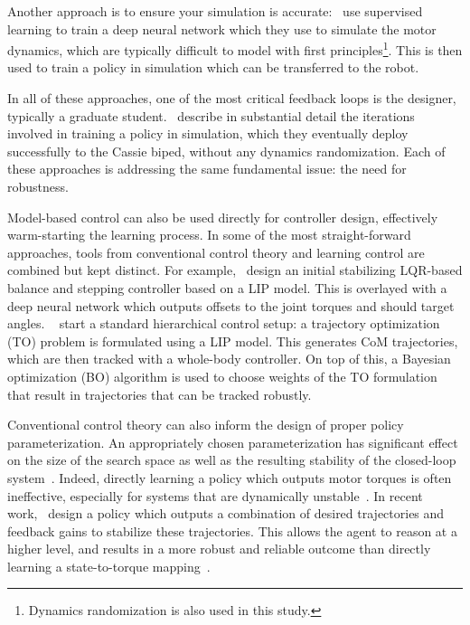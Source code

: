 Another approach is to ensure your simulation is accurate:~\textcite{hwangbo2019learning} use supervised learning to train a deep neural network which they use to simulate the motor dynamics, which are typically difficult to model with first principles\footnote{Dynamics randomization is also used in this study.}. This is then used to train a policy in simulation which can be transferred to the robot. \par
In all of these approaches, one of the most critical feedback loops is the designer, typically a graduate student.~\textcite{xie2019cassie} describe in substantial detail the iterations involved in training a policy in simulation, which they eventually deploy successfully to the Cassie biped, without any dynamics randomization.
Each of these approaches is addressing the same fundamental issue: the need for robustness. \par
Model-based control can also be used directly for controller design, effectively warm-starting the learning process. In some of the most straight-forward approaches, tools from conventional control theory and learning control are combined but kept distinct. For example,~\textcite{kumar2018improving} design an initial stabilizing LQR-based balance and stepping controller based on a LIP model. This is overlayed with a deep neural network which outputs offsets to the joint torques and should target angles.
~\textcite{yeganegi2019robust} start a standard hierarchical control setup: a trajectory optimization (TO) problem is formulated using a LIP model. This generates CoM trajectories, which are then tracked with a whole-body controller. On top of this, a Bayesian optimization (BO) algorithm is used to choose weights of the TO formulation that result in trajectories that can be tracked robustly. \par
Conventional control theory can also inform the design of proper policy parameterization. An appropriately chosen parameterization has significant effect on the size of the search space as well as the resulting stability of the closed-loop system~\cite{roberts2011feedback}. Indeed, directly learning a policy which outputs motor torques is often ineffective, especially for systems that are dynamically unstable~\cite{peng2017learning}. In recent work,~\textcite{viereck2018learning} design a policy which outputs a combination of desired trajectories and feedback gains to stabilize these trajectories. This allows the agent to reason at a higher level, and results in a more robust and reliable outcome than directly learning a state-to-torque mapping~\cite{viereck2018learning}.
